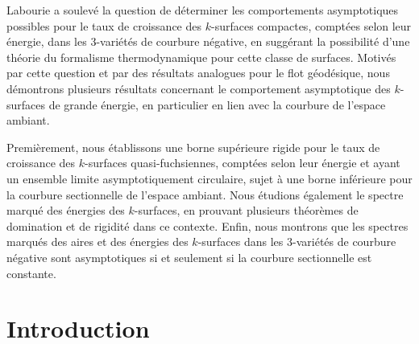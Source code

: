 \documentclass[JEP,XML,SOM,Unicode,NoEqCountersInSection,published]{cedram}
\theoremstyle{plain}
\theoremstyle{definition}
\begin{document}




\begin{altabstract}
Labourie a soulevé la question de déterminer les comportements asymptotiques possibles pour le taux de croissance des $k$-surfaces compactes, comptées selon leur énergie, dans les $3$\nobreakdash-variétés de courbure négative, en suggérant la possibilité d'une théorie du formalisme thermodynamique pour cette classe de surfaces. Motivés par cette question et par des résultats analogues pour le flot géodésique, nous démontrons plusieurs résultats concernant le comportement asymptotique des $k$-surfaces de grande énergie, en particulier en lien avec la courbure de l'espace ambiant.

Premièrement, nous établissons une borne supérieure rigide pour le taux de croissance des $k$-surfaces quasi-fuchsiennes, comptées selon leur énergie et ayant un ensemble limite asymptotiquement circulaire, sujet à une borne inférieure pour la courbure sectionnelle de l'espace ambiant. Nous étudions également le spectre marqué des énergies des $k$-surfaces, en prouvant plusieurs théorèmes de domination et de rigidité dans ce contexte. Enfin, nous montrons que les spectres marqués des aires et des énergies des $k$-surfaces dans les $3$\nobreakdash-variétés de courbure négative sont asymptotiques si et seulement si la courbure sectionnelle est constante.
\end{altabstract}

\maketitle

\tableofcontents
\mainmatter

\section{Introduction}
\end{document}
